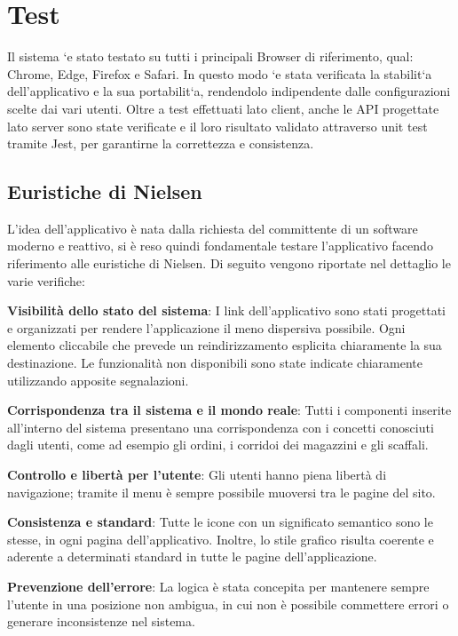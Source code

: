 \section{Test}
Il sistema `e stato testato su tutti i principali Browser di riferimento, qual: Chrome, Edge, Firefox e Safari. In questo modo `e stata verificata la stabilit`a dell’applicativo e la sua portabilit`a, rendendolo indipendente dalle configurazioni scelte dai vari utenti. Oltre a test effettuati lato client, anche le API progettate lato server sono state verificate e il loro risultato validato attraverso unit test tramite Jest, per garantirne la correttezza e consistenza.
\subsection{Euristiche di Nielsen}

L'idea dell'applicativo è nata dalla richiesta del committente di un software moderno e reattivo, si è reso quindi fondamentale testare l'applicativo facendo riferimento alle euristiche di Nielsen. Di seguito vengono riportate nel dettaglio le varie verifiche:

\textbf{Visibilità dello stato del sistema}: I link dell’applicativo sono stati progettati e organizzati per rendere l’applicazione il meno dispersiva possibile. Ogni elemento cliccabile che prevede un reindirizzamento esplicita chiaramente la sua destinazione. Le funzionalità non disponibili sono state indicate chiaramente utilizzando apposite segnalazioni.

\textbf{Corrispondenza tra il sistema e il mondo reale}: Tutti i componenti inserite all’interno del sistema presentano una corrispondenza con i concetti conosciuti dagli utenti, come ad esempio gli ordini, i corridoi dei magazzini e gli scaffali.

\textbf{Controllo e libertà per l’utente}: Gli utenti hanno piena libertà di navigazione; tramite il menu è sempre possibile muoversi tra le pagine del sito.

\textbf{Consistenza e standard}: Tutte le icone con un significato semantico sono le stesse, in ogni pagina dell'applicativo. Inoltre, lo stile grafico risulta coerente e aderente a determinati standard in tutte le pagine dell’applicazione.

\textbf{Prevenzione dell’errore}: La logica è stata concepita per mantenere sempre l’utente in una posizione non ambigua, in cui non è possibile commettere errori o generare inconsistenze nel sistema.

